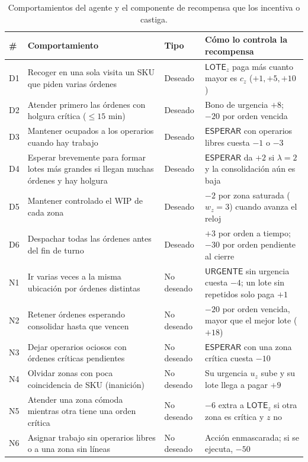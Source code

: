 \documentclass[11pt,letterpaper]{article}
\newcommand{\LOTE}[1]{\mathsf{LOTE}_{#1}}
\newcommand{\URG}{\mathsf{URGENTE}}
\newcommand{\ESP}{\mathsf{ESPERAR}}
\begin{document}
\begin{table}[h]
\centering\small
\begin{tabularx}{\textwidth}{@{}p{0.7cm}Lp{2.1cm}L@{}}
\toprule
\textbf{\#} & \textbf{Comportamiento} & \textbf{Tipo} & \textbf{Cómo lo controla la recompensa} \\
\midrule
D1 & Recoger en una sola visita un SKU que piden varias órdenes & Deseado & $\LOTE{z}$ paga más cuanto mayor es $c_z$ ($+1,+5,+10$) \\
D2 & Atender primero las órdenes con holgura crítica ($\le 15$ min) & Deseado & Bono de urgencia $+8$; $-20$ por orden vencida \\
D3 & Mantener ocupados a los operarios cuando hay trabajo & Deseado & $\ESP$ con operarios libres cuesta $-1$ o $-3$ \\
D4 & Esperar brevemente para formar lotes más grandes si llegan muchas órdenes y hay holgura & Deseado & $\ESP$ da $+2$ si $\lambda=2$ y la consolidación aún es baja \\
D5 & Mantener controlado el WIP de cada zona & Deseado & $-2$ por zona saturada ($w_z=3$) cuando avanza el reloj \\
D6 & Despachar todas las órdenes antes del fin de turno & Deseado & $+3$ por orden a tiempo; $-30$ por orden pendiente al cierre \\
\midrule
N1 & Ir varias veces a la misma ubicación por órdenes distintas & No deseado & $\URG$ sin urgencia cuesta $-4$; un lote sin repetidos solo paga $+1$ \\
N2 & Retener órdenes esperando consolidar hasta que vencen & No deseado & $-20$ por orden vencida, mayor que el mejor lote ($+18$) \\
N3 & Dejar operarios ociosos con órdenes críticas pendientes & No deseado & $\ESP$ con una zona crítica cuesta $-10$ \\
N4 & Olvidar zonas con poca coincidencia de SKU (inanición) & No deseado & Su urgencia $u_z$ sube y su lote llega a pagar $+9$ \\
N5 & Atender una zona cómoda mientras otra tiene una orden crítica & No deseado & $-6$ extra a $\LOTE{z}$ si otra zona es crítica y $z$ no \\
N6 & Asignar trabajo sin operarios libres o a una zona sin líneas & No deseado & Acción enmascarada; si se ejecuta, $-50$ \\
\bottomrule
\end{tabularx}
\caption{Comportamientos del agente y el componente de recompensa que los incentiva o castiga.}
\end{table}
\end{document}
